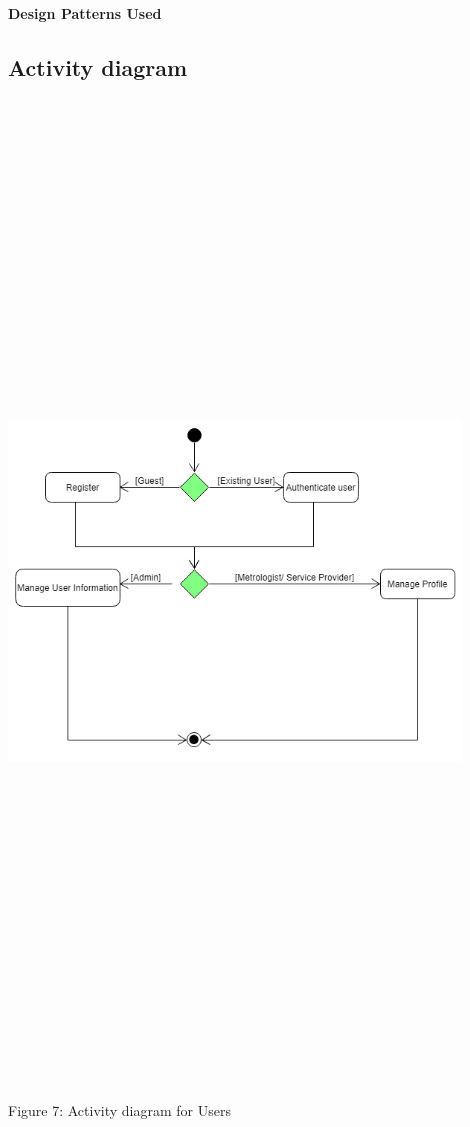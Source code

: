 \paragraph{Design Patterns Used}
	
	
		
\subsection{Activity diagram}
    \includegraphics[width=12cm,height=26cm,keepaspectratio]{users_unit/Images/users activity diagram.png}
	\begin{center}
	    \small{Figure 7: Activity diagram for Users}
    \end{center}



